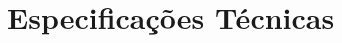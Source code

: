 \documentclass[a4paper, 10pt]{article}
\begin{document}
%
%
\newpage
\section{Especificações Técnicas}
\end{document}
